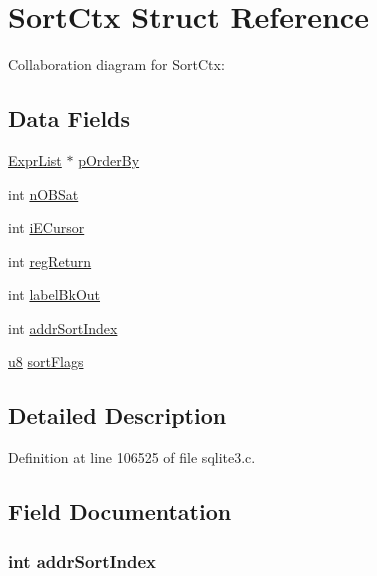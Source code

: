 \hypertarget{struct_sort_ctx}{}\section{Sort\+Ctx Struct Reference}
\label{struct_sort_ctx}


Collaboration diagram for Sort\+Ctx\+:
\subsection*{Data Fields}
\begin{DoxyCompactItemize}
\item 
\hyperlink{struct_expr_list}{Expr\+List} $\ast$ \hyperlink{struct_sort_ctx_a9150e506e5902e336130c9764caf96a0}{p\+Order\+By}
\item 
int \hyperlink{struct_sort_ctx_abf7461bfaf9f409471674af0c045dc54}{n\+O\+B\+Sat}
\item 
int \hyperlink{struct_sort_ctx_af85b7d63b053f06fbdf8c26cdbde67b1}{i\+E\+Cursor}
\item 
int \hyperlink{struct_sort_ctx_a02d21bd92b68681173d2e26e9525d0ae}{reg\+Return}
\item 
int \hyperlink{struct_sort_ctx_ad532cc45c059d32a96797f72d40a0d86}{label\+Bk\+Out}
\item 
int \hyperlink{struct_sort_ctx_acee11f59be9019ae76d080ca92e8dc03}{addr\+Sort\+Index}
\item 
\hyperlink{sqlite3_8c_a74a0f6424ae628af25f23f0a35f6ead3}{u8} \hyperlink{struct_sort_ctx_a4ecd70526db6172f0af238c6f66ffef1}{sort\+Flags}
\end{DoxyCompactItemize}


\subsection{Detailed Description}


Definition at line 106525 of file sqlite3.\+c.



\subsection{Field Documentation}
\hypertarget{struct_sort_ctx_acee11f59be9019ae76d080ca92e8dc03}{}
\subsubsection[{addr\+Sort\+Index}]{\setlength{\rightskip}{0pt plus 5cm}int addr\+Sort\+Index}\label{struct_sort_ctx_acee11f59be9019ae76d080ca92e8dc03}


